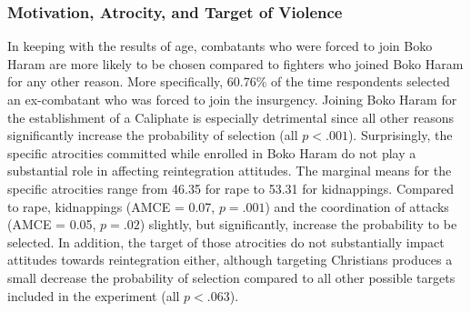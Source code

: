 \subsubsection{Motivation, Atrocity, and Target of Violence}
In keeping with the results of age, combatants who were forced to join Boko Haram are more likely to be chosen compared to fighters who joined Boko Haram for any other reason. More specifically, 60.76\% of the time respondents selected an ex-combatant who was forced to join the insurgency. Joining Boko Haram for the establishment of a Caliphate is especially detrimental since all other reasons significantly increase the probability of selection (all $p < .001$). Surprisingly, the specific atrocities committed while enrolled in Boko Haram do not play a substantial role in affecting reintegration attitudes. The marginal means for the specific atrocities range from 46.35 for rape to 53.31 for kidnappings. Compared to rape, kidnappings (AMCE = 0.07, $p = .001$) and the coordination of attacks (AMCE = 0.05, $p = .02$) slightly, but significantly, increase the probability to be selected. In addition, the target of those atrocities do not substantially impact attitudes towards reintegration either, although targeting Christians produces a small decrease the probability of selection compared to all other possible targets included in the experiment (all $p < .063$).


